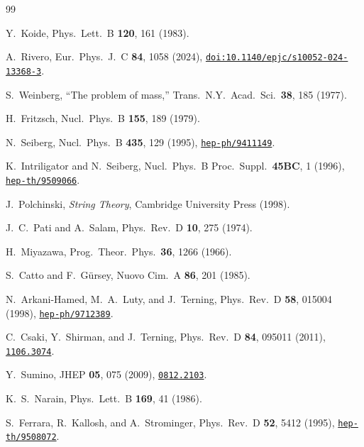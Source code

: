 \documentclass[12pt,a4paper]{article}
\begin{document}
\begin{thebibliography}{99}

  Y.~Koide,
  Phys.\ Lett.\ B \textbf{120}, 161 (1983).

  A.~Rivero,
  Eur.\ Phys.\ J.\ C \textbf{84}, 1058 (2024),
  \href{https://doi.org/10.1140/epjc/s10052-024-13368-3}%
    {\texttt{doi:10.1140/epjc/s10052-024-13368-3}}.

  S.~Weinberg,
  ``The problem of mass,''
  Trans.\ N.Y.\ Acad.\ Sci.\ \textbf{38}, 185 (1977).

  H.~Fritzsch,
  Nucl.\ Phys.\ B \textbf{155}, 189 (1979).

  N.~Seiberg,
  Nucl.\ Phys.\ B \textbf{435}, 129 (1995),
  \href{https://arxiv.org/abs/hep-ph/9411149}{\texttt{hep-ph/9411149}}.

  K.~Intriligator and N.~Seiberg,
  Nucl.\ Phys.\ B Proc.\ Suppl.\ \textbf{45BC}, 1 (1996),
  \href{https://arxiv.org/abs/hep-th/9509066}{\texttt{hep-th/9509066}}.

  J.~Polchinski,
  \textit{String Theory},
  Cambridge University Press (1998).

  J.~C.~Pati and A.~Salam,
  Phys.\ Rev.\ D \textbf{10}, 275 (1974).

  H.~Miyazawa,
  Prog.\ Theor.\ Phys.\ \textbf{36}, 1266 (1966).

  S.~Catto and F.~G\"ursey,
  Nuovo Cim.\ A \textbf{86}, 201 (1985).

  N.~Arkani-Hamed, M.~A.~Luty, and J.~Terning,
  Phys.\ Rev.\ D \textbf{58}, 015004 (1998),
  \href{https://arxiv.org/abs/hep-ph/9712389}{\texttt{hep-ph/9712389}}.

  C.~Csaki, Y.~Shirman, and J.~Terning,
  Phys.\ Rev.\ D \textbf{84}, 095011 (2011),
  \href{https://arxiv.org/abs/1106.3074}{\texttt{1106.3074}}.

  Y.~Sumino,
  JHEP \textbf{05}, 075 (2009),
  \href{https://arxiv.org/abs/0812.2103}{\texttt{0812.2103}}.

  K.~S.~Narain,
  Phys.\ Lett.\ B \textbf{169}, 41 (1986).

  S.~Ferrara, R.~Kallosh, and A.~Strominger,
  Phys.\ Rev.\ D \textbf{52}, 5412 (1995),
  \href{https://arxiv.org/abs/hep-th/9508072}{\texttt{hep-th/9508072}}.


\end{thebibliography}
\end{document}
